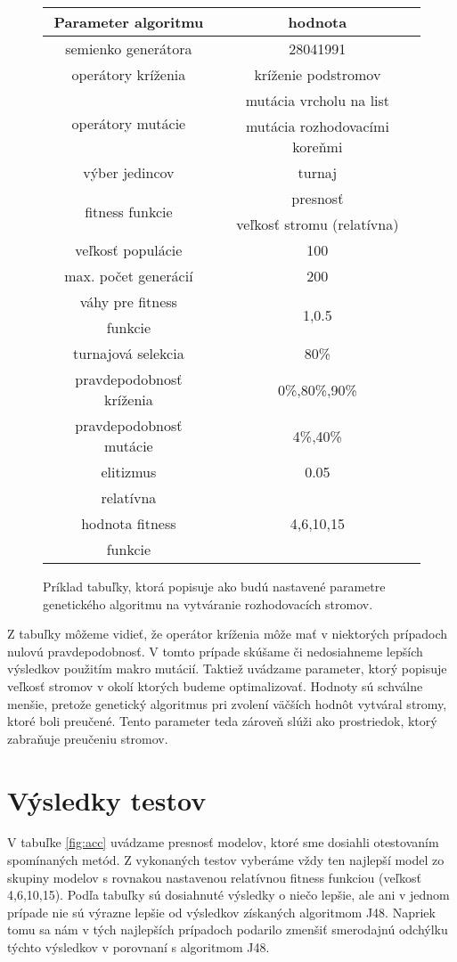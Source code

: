 \begin{figure}[h]
\centering
\begin{tabular}{|c c|}
\hline 
Parameter algoritmu & hodnota \\
\hline
semienko generátora & 28041991 \\
\hline
operátory kríženia & kríženie podstromov \\
\hline
\multirow{2}{*}{operátory mutácie} & mutácia vrcholu na list \\
 & mutácia rozhodovacími koreňmi \\
\hline
výber jedincov & turnaj \\
\hline
\multirow{2}{*}{fitness funkcie} & presnosť\\
 & veľkosť stromu (relatívna) \\
\hline
veľkosť populácie & 100 \\
\hline
max. počet generácií & 200 \\
\hline
váhy pre fitness & \multirow{2}{*}{1,0.5} \\
funkcie & \\
\hline
turnajová selekcia & 80\% \\
\hline
pravdepodobnosť kríženia & 0\%,80\%,90\%\\
\hline
pravdepodobnosť mutácie & 4\%,40\%\\
\hline
elitizmus & 0.05\\
\hline
relatívna & \multirow{3}{*}{4,6,10,15}\\
hodnota fitness & \\
funkcie & \\
\hline
\end{tabular}
\caption{Príklad tabuľky, ktorá popisuje ako budú nastavené parametre genetického algoritmu na vytváranie rozhodovacích stromov.}\label{fig:configs}
\end{figure}

Z tabuľky môžeme vidieť, že operátor kríženia môže mať v niektorých prípadoch nulovú pravdepodobnosť. V tomto prípade skúšame či nedosiahneme lepších výsledkov použitím makro mutácií.
Taktiež uvádzame parameter, ktorý popisuje veľkosť stromov v okolí ktorých budeme optimalizovať. Hodnoty sú schválne menšie, pretože genetický algoritmus pri zvolení väčších hodnôt vytváral stromy, ktoré boli preučené. Tento parameter teda zároveň slúži ako prostriedok, ktorý zabraňuje preučeniu stromov. 

\section{Výsledky testov}\label{kap5:Results}
V tabuľke \ref{fig:acc} uvádzame presnosť modelov, ktoré sme dosiahli otestovaním spomínaných metód. Z vykonaných testov vyberáme vždy ten najlepší model zo skupiny modelov s rovnakou nastavenou relatívnou fitness funkciou (veľkosť 4,6,10,15). Podľa tabuľky sú dosiahnuté výsledky o niečo lepšie, ale ani v jednom prípade nie sú výrazne lepšie od výsledkov získaných algoritmom J48. Napriek tomu sa nám v tých najlepších prípadoch podarilo zmenšiť smerodajnú odchýlku týchto výsledkov v porovnaní s algoritmom J48.

